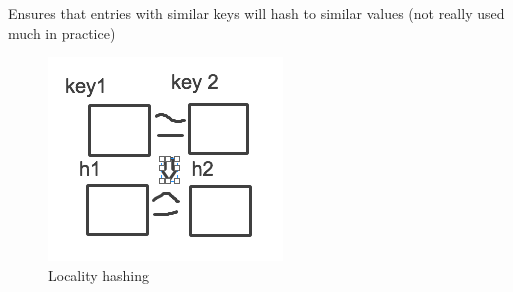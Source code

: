 \documentclass[twoside]{article}
\begin{document}
Ensures that entries with similar keys will hash to similar values (not really used much in practice)\\
\begin{figure}[h]
\centering
\includegraphics[width=0.5\linewidth]{fig1}
\caption[]{Locality hashing}
\label{cpl}
\end{figure}\\
\end{document}
